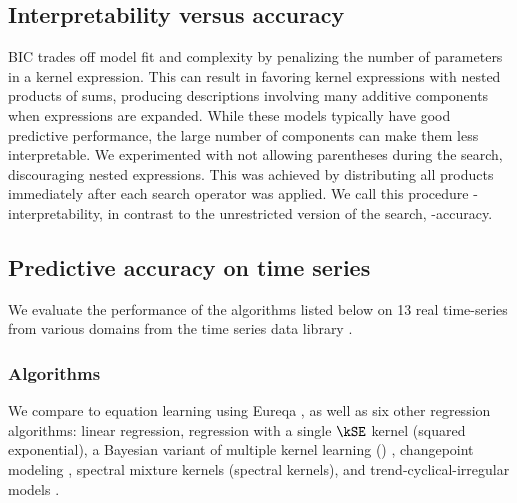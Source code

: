 \subsection{Interpretability versus accuracy}

BIC trades off model fit and complexity by penalizing the number of parameters in a kernel expression.
This can result in \procedurename{} favoring kernel expressions with nested products of sums, producing descriptions involving many additive components when expressions are expanded.
While these models typically have good predictive performance, the large number of components can make them less interpretable.
We experimented with not allowing parentheses during the search, discouraging nested expressions.
This was achieved by distributing all products immediately after each search operator was applied.
We call this procedure \procedurename{}-interpretability, in contrast to the unrestricted version of the search, \procedurename{}-accuracy.


\subsection{Predictive accuracy on time series}



We evaluate the performance of the algorithms listed below on 13 real time-series from various domains from the time series data library \citep{TSDL}.



\subsubsection{Algorithms}

We compare \procedurename{} to equation learning using Eureqa \citep{Eureqa}, as well as six other regression algorithms:
linear regression,
\gp{} regression with a single $\kSE$ kernel (squared exponential),
a Bayesian variant of multiple kernel learning (\MKL{}) \citep[e.g.][]{gonen2011multiple, bach2004multiple},
changepoint modeling \citep[e.g.][]{garnett2010sequential, saatcci2010gaussian, FoxDunson:NIPS2012},
spectral mixture kernels \citep{WilAda13} (spectral kernels),
and trend-cyclical-irregular models \citep[e.g.][]{lind2006basic}.

